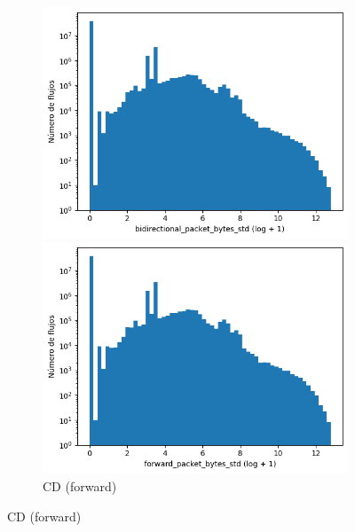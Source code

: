 \begin{figure}[H]
    \centering
    \hfill
    \begin{subfigure}[b]{0.26\textwidth}
        \centering
        \includegraphics[width=\textwidth]{media/packet_pincer_cicddos/bidirectional_packet_bytes_std_log_x_log_y.png}
        \caption{CD (bidir.)}
        \includegraphics[width=\textwidth]{media/packet_pincer_cicddos/forward_packet_bytes_std_log_x_log_y.png}
        \caption{CD (forward)}

\end{subfigure}
\end{figure}
